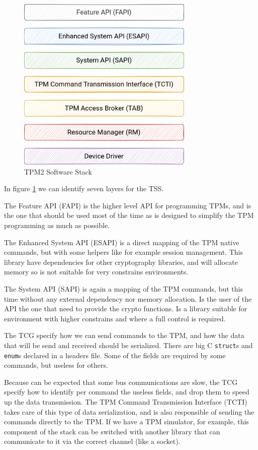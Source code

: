 \documentclass{article}
\begin{document}
\begin{figure}[h]
  \centering
  \includegraphics[width=0.75\textwidth]{TPMAPI}
  \caption{TPM2 Software Stack}
  \label{fig:tpmapi}
\end{figure}

In figure \ref{fig:tpmapi} we can identify seven layers for the TSS.

The Feature API (FAPI) is the higher level API for programming TPMs,
and is the one that should be used most of the time as is designed to
simplify the TPM programming as much as possible.

The Enhanced System API (ESAPI) is a direct mapping of the TPM native
commands, but with some helpers like for example session management.
This library have dependencies for other cryptography libraries, and
will allocate memory so is not suitable for very constrains
environments.

The System API (SAPI) is again a mapping of the TPM commands, but this
time without any external dependency nor memory allocation.  Is the
user of the API the one that need to provide the crypto functions.  Is
a library suitable for environment with higher constrains and where a
full control is required.

The TCG specify how we can send commands to the TPM, and how the data
that will be send and received should be serialized.  There are big C
\texttt{struct}s and \texttt{enum}s declared in a headers file.  Some
of the fields are required by some commands, but useless for others.

Because can be expected that some bus communications are slow, the TCG
specify how to identify per command the useless fields, and drop them
to speed up the data transmission.  The TPM Command Transmission
Interface (TCTI) takes care of this type of data serialization, and is
also responsible of sending the commands directly to the TPM.  If we
have a TPM simulator, for example, this component of the stack can be
switched with another library that can communicate to it via the
correct channel (like a socket).
\end{document}
